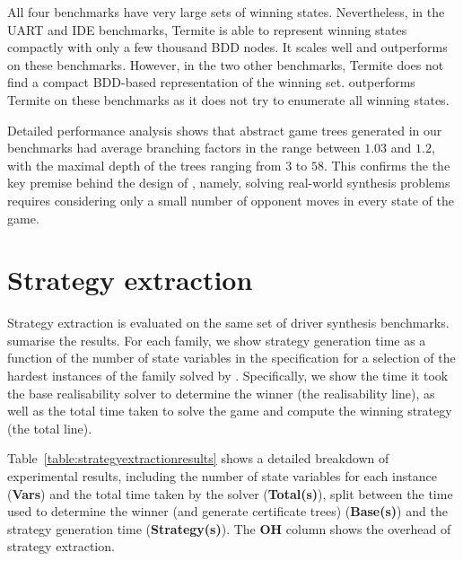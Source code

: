All four benchmarks have very large sets of winning states.  
Nevertheless, in the UART and IDE benchmarks, Termite is able to 
represent winning states compactly with only a few thousand BDD 
nodes.  It scales well and outperforms \eva on these benchmarks.  
However, in the two other benchmarks, Termite does not find a 
compact BDD-based representation of the winning set.  \eva 
outperforms Termite on these benchmarks as it does not try to 
enumerate all winning states.

{Detailed performance analysis shows that 
abstract game trees generated in our benchmarks had average 
branching factors in the range between $1.03$ and $1.2$, with 
the maximal depth of the trees ranging from $3$ to $58$.  This
confirms the the key premise behind the design of \eva, namely, 
solving real-world synthesis problems requires considering only a 
small number of opponent moves in every state of the game.}  

\clearpage

\section{Strategy extraction}


Strategy extraction is evaluated on the same set of driver synthesis benchmarks.   sumarise the results.  For each family, we show strategy generation time as a function of the number of state variables in the specification for a selection of the hardest instances of the family solved by \eva.  Specifically, we show the time it took the base realisability solver to determine the winner (the realisability line), as well as the total time taken to solve the game and compute the winning strategy (the total line).


Table~\ref{table:strategyextractionresults} shows a detailed breakdown of experimental results, including the number of state variables for each instance (\textbf{Vars}) and the total time taken by the solver (\textbf{Total(s)}), split between the time used to determine the winner (and generate certificate trees) (\textbf{Base(s)}) and the strategy generation time (\textbf{Strategy(s)}). The \textbf{OH} column shows the overhead of strategy extraction.

